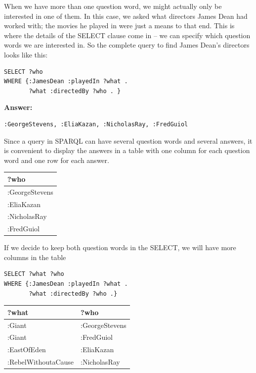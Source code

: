When we have more than one question word, we might actually only be
interested in one of them. In this case, we asked what directors James
Dean had worked with; the movies he played in were just a means to that
end. This is where the details of the SELECT clause come in -- we can
specify which question words we are interested in. So the complete query
to find James Dean's directors looks like this:


\begin{lstlisting}
SELECT ?who
WHERE {:JamesDean :playedIn ?what .
       ?what :directedBy ?who . }
\end{lstlisting}

\textbf{\textbf{Answer:}}

\begin{lstlisting}
:GeorgeStevens, :EliaKazan, :NicholasRay, :FredGuiol
\end{lstlisting}

Since a query in SPARQL can have several question words and several
answers, it is convenient to display the answers in a table with one
column for each question word and one row for each answer.

\begin{tabular}{|l|}
\hline
?who\\
\hline
:GeorgeStevens\\
:EliaKazan\\
:NicholasRay\\
:FredGuiol\\
\hline
\end{tabular}

If we decide to keep both question words in the SELECT, we will have
more columns in the table


\begin{lstlisting}
SELECT ?what ?who
WHERE {:JamesDean :playedIn ?what .
       ?what :directedBy ?who .}
\end{lstlisting}

\begin{tabular}{| l l | }
\hline
?what&?who\\
\hline
:Giant&:GeorgeStevens\\
:Giant&:FredGuiol\\
:EastOfEden&:EliaKazan\\
:RebelWithoutaCause&:NicholasRay\\
\hline
\end{tabular}


